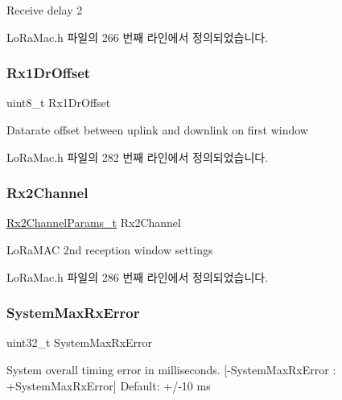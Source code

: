 Receive delay 2 

Lo\+Ra\+Mac.\+h 파일의 266 번째 라인에서 정의되었습니다.

\mbox{\label{structs_lo_ra_mac_params_a7de51959047aa36190c0a59485397244}} 
\subsubsection{\texorpdfstring{Rx1\+Dr\+Offset}{Rx1DrOffset}}
{\footnotesize\ttfamily uint8\+\_\+t Rx1\+Dr\+Offset}

Datarate offset between uplink and downlink on first window 

Lo\+Ra\+Mac.\+h 파일의 282 번째 라인에서 정의되었습니다.

\mbox{\label{structs_lo_ra_mac_params_aa0fbe93ff398020c65d2431af19368e8}} 
\subsubsection{\texorpdfstring{Rx2\+Channel}{Rx2Channel}}
{\footnotesize\ttfamily \mbox{\hyperlink{group___l_o_r_a_m_a_c_ga8f57f29481ea92c24f6af04b96a95e0f}{Rx2\+Channel\+Params\+\_\+t}} Rx2\+Channel}

Lo\+Ra\+M\+AC 2nd reception window settings 

Lo\+Ra\+Mac.\+h 파일의 286 번째 라인에서 정의되었습니다.

\mbox{\label{structs_lo_ra_mac_params_a62adc341212fe903e9995966051c5fee}} 
\subsubsection{\texorpdfstring{System\+Max\+Rx\+Error}{SystemMaxRxError}}
{\footnotesize\ttfamily uint32\+\_\+t System\+Max\+Rx\+Error}

System overall timing error in milliseconds. \mbox{[}-\/\+System\+Max\+Rx\+Error \+: +\+System\+Max\+Rx\+Error\mbox{]} Default\+: +/-\/10 ms 

